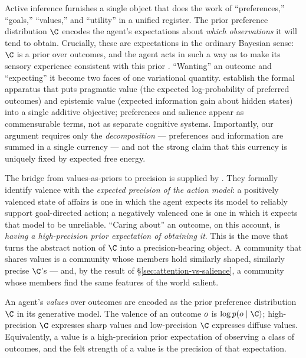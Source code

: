 Active inference furnishes a single object that does the work of
``preferences,'' ``goals,'' ``values,'' and ``utility'' in a unified register.
The prior preference distribution $\C$ encodes the agent's expectations about
\emph{which observations} it will tend to obtain. Crucially, these are
expectations in the ordinary Bayesian sense: $\C$ is a prior over outcomes,
and the agent acts in such a way as to make its sensory experience consistent
with this prior \citep{friston2015ActiveInferenceEpistemic}. ``Wanting'' an
outcome and ``expecting'' it become two faces of one variational quantity.
\citet{friston2015ActiveInferenceEpistemic} establish the formal apparatus that
puts pragmatic value (the expected log-probability of preferred outcomes) and
epistemic value (expected information gain about hidden states) into a single
additive objective; preferences and salience appear as commensurable terms,
not as separate cognitive systems. Importantly, our argument requires only the
\emph{decomposition} --- preferences and information are summed in a single
currency --- and not the strong claim that this currency is uniquely fixed by
expected free energy.

The bridge from values-as-priors to precision is supplied by
\citet{hesp2021DeeplyFelt}. They formally identify valence with the
\emph{expected precision of the action model}: a positively valenced state of
affairs is one in which the agent expects its model to reliably support
goal-directed action; a negatively valenced one is one in which it expects
that model to be unreliable. ``Caring about'' an outcome, on this account, is
\emph{having a high-precision prior expectation of obtaining it}. This is
the move that turns the abstract notion of $\C$ into a precision-bearing
object. A community that shares values is a community whose members hold
similarly shaped, similarly precise $\C$'s --- and, by the result of
\S\ref{sec:attention-vs-salience}, a community whose members find the same
features of the world salient.

\begin{definition}
\label{def:values}
An agent's \emph{values} over outcomes are encoded as the prior preference
distribution $\C$ in its generative model. The valence of an outcome $o$ is
$\log p(\obs \mid \C)$; high-precision $\C$ expresses sharp values and
low-precision $\C$ expresses diffuse values. Equivalently, a value is a
high-precision prior expectation of observing a class of outcomes, and the
felt strength of a value is the precision of that expectation.
\end{definition}


